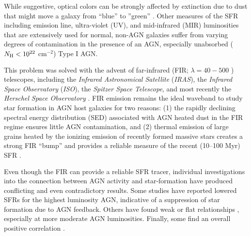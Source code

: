 \documentclass[fleqn, usenatbib]{mnras}
\newcommand{\herschel}{\emph{Herschel}}
\begin{document}
While suggestive, optical colors can be strongly affected by extinction due to dust that might move a galaxy from ``blue'' to ''green'' \citep{Cowie:2008qy, Cardamone:2010uq}. Other measures of the SFR including emission line, ultra-violet (UV), and mid-infrared (MIR) luminosities that are extensively used for normal, non-AGN galaxies suffer from varying degrees of contamination in the presence of an AGN, especially unabsorbed ($N_{\rm H} < 10^{22}$ cm$^{-2}$) Type I AGN.


This problem was solved with the advent of far-infrared (FIR; $\lambda = 40-500$ \micron) telescopes, including the \textit{Infrared Astronomical Satellite} (\textit{IRAS}), the \textit{Infrared Space Observatory} (\textit{ISO}), the \textit{Spitzer Space Telescope}, and most recently the \herschel{} \textit{Space Observatory} \citep{Pilbratt:2010rz}. FIR emission remains the ideal waveband to study star formation in AGN host galaxies for two reasons: (1) the rapidly declining spectral energy distribution (SED) associated with AGN heated dust in the FIR regime \citep{Fritz:2006yq, Netzer:2007ve, Mullaney:2011yq, Shi:2014qr} ensures little AGN contamination, and (2) thermal emission of large grains heated by the ionizing emission of recently formed massive stars \citep{Lonsdale-Persson:1987uq, Devereux:1990yq} creates a strong FIR ``bump'' and provides a reliable measure of the recent (10--100 Myr) SFR \citep{Kennicutt:1998kx}.

Even though the FIR can provide a reliable SFR tracer, individual investigations into the connection between AGN activity and star-formation have produced conflicting and even contradictory results. Some studies \citep{Page:2012mz, Barger:2015ly} have reported lowered SFRs for the highest luminosity AGN, indicative of a suppression of star formation due to AGN feedback. Others have found weak or flat relationships \citep{Diamond-Stanic:2012rw, Mullaney:2012gf, Rovilos:2012wd, Rosario:2012fr, Azadi:2015ve, Stanley:2015qy}, especially at more moderate AGN luminosities. Finally, some find an overall positive correlation \citep{Lutz:2008ph, Netzer:2009lr, Rovilos:2012wd, Rosario:2012fr, Chen:2013uq, Dai:2015gf}. %
\end{document}
